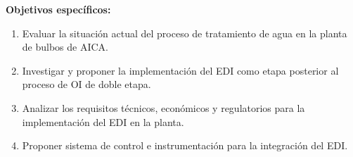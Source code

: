 \textbf{Objetivos específicos:}
\begin{enumerate}
    \item Evaluar la situación actual del proceso de tratamiento de agua en la planta de bulbos de AICA.
    \item Investigar y proponer la implementación del EDI como etapa posterior al proceso de OI de doble etapa.
    \item Analizar los requisitos técnicos, económicos y regulatorios para la implementación del EDI en la planta.
    \item Proponer sistema de control e instrumentación para la integración del EDI.
\end{enumerate}